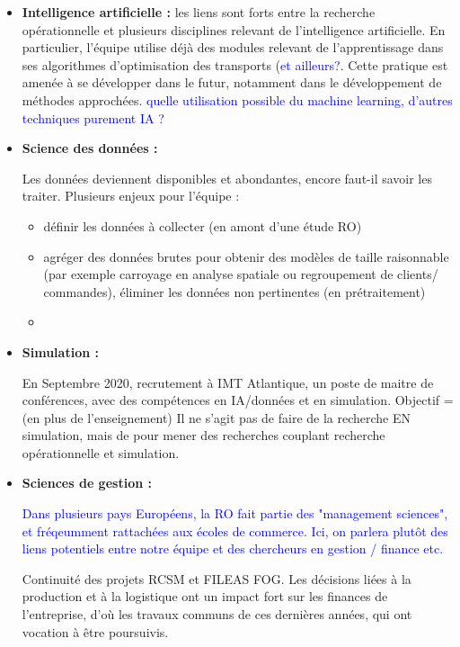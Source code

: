 	\begin{itemize}
	    \item \textbf{Intelligence artificielle :} les liens sont forts entre la recherche opérationnelle et plusieurs disciplines relevant de l'intelligence artificielle. En particulier, l'équipe utilise déjà des modules relevant de l'apprentissage dans ses algorithmes d'optimisation des transports (\textcolor{blue}{et ailleurs?}. Cette pratique est amenée à se développer dans le futur, notamment dans le développement de méthodes approchées. \textcolor{blue}{quelle utilisation possible du machine learning, d'autres techniques purement IA ? }
	    
	    
	    \item \textbf{Science des données : }
	    
	    Les données deviennent disponibles et abondantes, encore faut-il savoir les traiter. Plusieurs enjeux pour l'équipe \slp : 
	    \begin{itemize}
	        \item définir les données à collecter (en amont d'une étude RO)
	        \item agréger des données brutes pour obtenir des modèles de taille raisonnable (par exemple carroyage en analyse spatiale ou regroupement de clients/ commandes), éliminer les données non pertinentes (en prétraitement)
	        \item 
	    \end{itemize}
	    
	    \item \textbf{Simulation : }
	    
	    En Septembre 2020, recrutement à IMT Atlantique, un poste de maitre de conférences, avec des compétences en IA/données et en simulation. 
	    Objectif = (en plus de l'enseignement) Il ne s'agit pas de faire de la recherche EN simulation, mais de pour mener des recherches couplant recherche opérationnelle et simulation.
	    
	    
	    \item \textbf{Sciences de gestion : }
	    
	    \textcolor{blue}{Dans plusieurs pays Européens, la RO fait partie des "management sciences", et fréqeumment rattachées aux écoles de commerce. Ici, on parlera plutôt des liens potentiels entre notre équipe et des chercheurs en gestion / finance etc.}
	    
	    Continuité des projets RCSM et FILEAS FOG. Les décisions liées à la production et à la logistique ont un impact fort sur les finances de l'entreprise, d'où les travaux communs de ces dernières années, qui ont vocation à être poursuivis. 
	    

\end{itemize}
